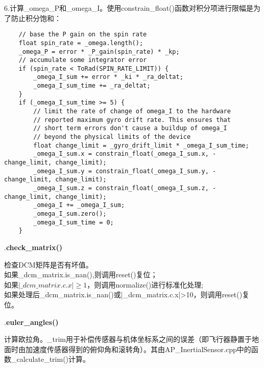 \documentclass[a4paper,10pt]{ctexart} %
\begin{document}
6.计算\_omega\_P和\_omega\_I。使用constrain\_float()函数对积分项进行限幅是为了防止积分饱和：
\begin{lstlisting}
    // base the P gain on the spin rate
    float spin_rate = _omega.length();
    _omega_P = error * _P_gain(spin_rate) * _kp;
    // accumulate some integrator error
    if (spin_rate < ToRad(SPIN_RATE_LIMIT)) {
        _omega_I_sum += error * _ki * _ra_deltat;
        _omega_I_sum_time += _ra_deltat;
    }
    if (_omega_I_sum_time >= 5) {
        // limit the rate of change of omega_I to the hardware
        // reported maximum gyro drift rate. This ensures that
        // short term errors don't cause a buildup of omega_I
        // beyond the physical limits of the device
        float change_limit = _gyro_drift_limit * _omega_I_sum_time;
        _omega_I_sum.x = constrain_float(_omega_I_sum.x, -change_limit, change_limit);
        _omega_I_sum.y = constrain_float(_omega_I_sum.y, -change_limit, change_limit);
        _omega_I_sum.z = constrain_float(_omega_I_sum.z, -change_limit, change_limit);
        _omega_I += _omega_I_sum;
        _omega_I_sum.zero();
        _omega_I_sum_time = 0;
    }
\end{lstlisting}


\vspace{10pt}

.\textbf{check\_matrix()}

检查DCM矩阵是否有坏值。\\
如果\_dcm\_matrix.is\_nan(),则调用reset()复位；\\
如果$|\_dcm\_matrix.c.x|\ge1$，则调用normalize()进行标准化处理;\\
如果处理后\_dcm\_matrix.is\_nan()或|\_dcm\_matrix.c.x|>10，则调用reset()复位。

\vspace{10pt}

.\textbf{euler\_angles()}

计算欧拉角。\_trim用于补偿传感器与机体坐标系之间的误差（即飞行器静置于地面时由加速度传感器得到的俯仰角和滚转角）。其由AP\_InertialSensor.cpp中的函数\_calculate\_trim()计算。
\end{document}
